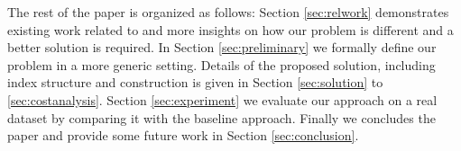 The rest of the paper is organized as follows: Section \ref{sec:relwork} demonstrates existing work related to {\rrp} and more insights on how our problem is different and a better solution is required. In Section \ref{sec:preliminary} we formally define our problem in a more generic setting. Details of the proposed solution, including index structure and construction is given in Section \ref{sec:solution} to \ref{sec:costanalysis}. Section \ref{sec:experiment} we evaluate our approach on a real dataset by comparing it with the baseline approach. Finally we concludes the paper and provide some future work in Section \ref{sec:conclusion}.

